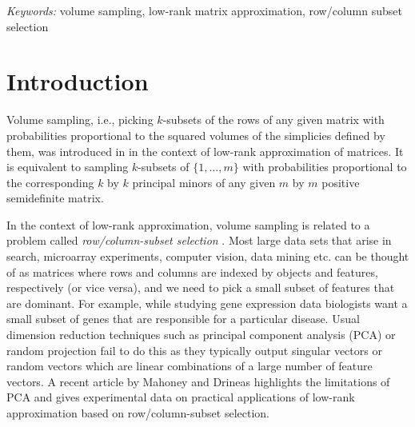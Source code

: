 \documentclass[11pt]{article}
\newcommand{\keywords}[1]{\emph{Keywords:} #1}
\begin{document}
\keywords{volume sampling, low-rank matrix approximation, row/column subset selection}

\section{Introduction}

Volume sampling, i.e., picking $k$-subsets of the rows of any given matrix with probabilities proportional to the squared volumes of the simplicies defined by them, was introduced in \cite{DRVW} in the context of low-rank approximation of matrices. It is equivalent to sampling $k$-subsets of $\{1, \dotsc, m\}$ with probabilities proportional to the corresponding $k$ by $k$ principal minors of any given $m$ by $m$ positive semidefinite matrix.

In the context of low-rank approximation, volume sampling is related to a problem called \emph{row/column-subset selection} \cite{BDM}. Most large data sets that arise in search, microarray experiments, computer vision, data mining etc. can be thought of as matrices where rows and columns are indexed by objects and features, respectively (or vice versa), and we need to pick a small subset of features that are dominant. For example, while studying gene expression data biologists want a small subset of genes that are responsible for a particular disease. Usual dimension reduction techniques such as principal component analysis (PCA) or random projection fail to do this as they typically output singular vectors or random vectors which are linear combinations of a large number of feature vectors. A recent article by Mahoney and Drineas \cite{MD} highlights the limitations of PCA and gives experimental data on practical applications of low-rank approximation based on row/column-subset selection.
\end{document}
